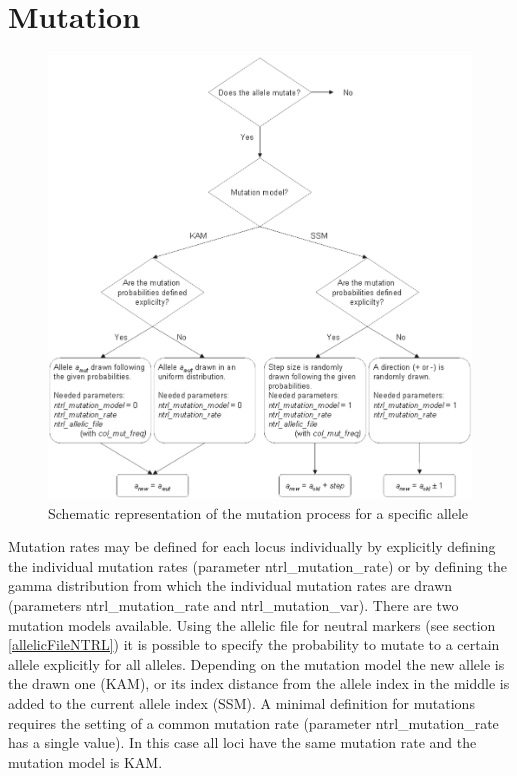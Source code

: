 \documentclass[letterpaper,12pt,oneside]{book}
\begin{document}
\section{Mutation}

\begin{figure}[htbp]
	\centering
		\includegraphics[width=1\textwidth]{mutation-ntrl.pdf}
	\caption{Schematic representation of the mutation process for a specific allele}
	\label{fig:mutation-ntrl}
\end{figure}

Mutation rates may be defined for each locus individually by explicitly defining the individual mutation rates (parameter \textsf{ntrl\_mutation\_rate}) or by defining the gamma distribution from which the individual mutation rates are drawn (parameters \textsf{ntrl\_mutation\_rate} and \textsf{ntrl\_mutation\_var}). There are two mutation models available. Using the allelic file for neutral markers (see section \ref{allelicFileNTRL}) it is possible to specify the probability to mutate to a certain allele explicitly for all alleles. Depending on the mutation model the new allele is the drawn one (KAM), or its index distance from the allele index in the middle is added to the current allele index (SSM). A minimal definition for mutations requires the setting of a common mutation rate (parameter \textsf{ntrl\_mutation\_rate} has a single value). In this case all loci have the same mutation rate and the mutation model is KAM.
\end{document}
